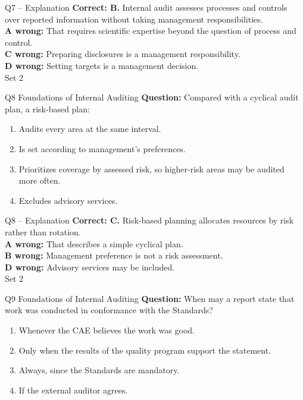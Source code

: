 \documentclass[aspectratio=169,10pt]{beamer}
\begin{document}
\begin{frame}[t]{Q7 -- Explanation}
	\footnotesize
	\textbf{Correct: B.} Internal audit assesses processes and controls over reported information without taking management responsibilities. \\[5pt]
\textbf{A wrong:} That requires scientific expertise beyond the question of process and control. \\[3pt]
\textbf{C wrong:} Preparing disclosures is a management responsibility. \\[3pt]
\textbf{D wrong:} Setting targets is a management decision. \\[3pt]
	\vfill {\tiny Set 2}
\end{frame}

\begin{frame}[t]{Q8 \hfill {\scriptsize Foundations of Internal Auditing}}
	\small
	\textbf{Question:} Compared with a cyclical audit plan, a risk-based plan:
	\begin{enumerate}[label=\Alph*.,itemsep=1pt,topsep=3pt]
			\item Audits every area at the same interval.
			\item Is set according to management's preferences.
			\item Prioritizes coverage by assessed risk, so higher-risk areas may be audited more often.
			\item Excludes advisory services.
	\end{enumerate}
\end{frame}

\begin{frame}[t]{Q8 -- Explanation}
	\footnotesize
	\textbf{Correct: C.} Risk-based planning allocates resources by risk rather than rotation. \\[5pt]
\textbf{A wrong:} That describes a simple cyclical plan. \\[3pt]
\textbf{B wrong:} Management preference is not a risk assessment. \\[3pt]
\textbf{D wrong:} Advisory services may be included. \\[3pt]
	\vfill {\tiny Set 2}
\end{frame}

\begin{frame}[t]{Q9 \hfill {\scriptsize Foundations of Internal Auditing}}
	\small
	\textbf{Question:} When may a report state that work was conducted in conformance with the Standards?
	\begin{enumerate}[label=\Alph*.,itemsep=1pt,topsep=3pt]
			\item Whenever the CAE believes the work was good.
			\item Only when the results of the quality program support the statement.
			\item Always, since the Standards are mandatory.
			\item If the external auditor agrees.
	\end{enumerate}
\end{frame}
\end{document}
